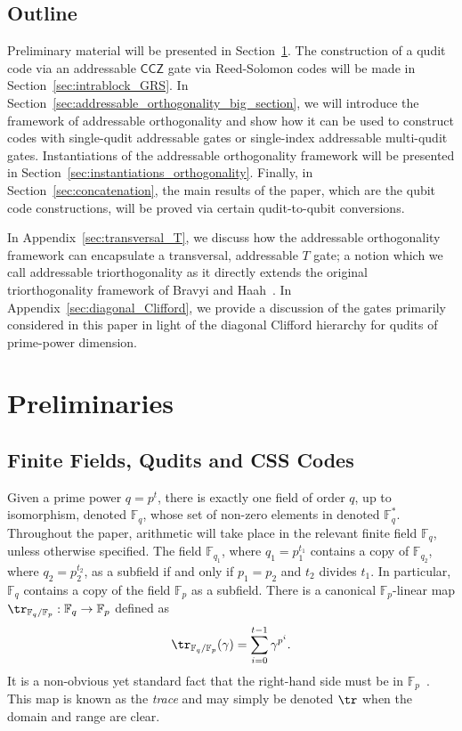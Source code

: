 \documentclass[11pt]{article}
\theoremstyle{definition}
\newcommand{\CCZ}{\mathsf{CCZ}}
\begin{document}
    \subsection{Outline}
    
    Preliminary material will be presented in Section~\ref{sec:prelim}. The construction of a qudit code via an addressable $\CCZ$ gate via Reed-Solomon codes will be made in Section~\ref{sec:intrablock_GRS}. In Section~\ref{sec:addressable_orthogonality_big_section}, we will introduce the framework of addressable orthogonality and show how it can be used to construct codes with single-qudit addressable gates or single-index addressable multi-qudit gates. Instantiations of the addressable orthogonality framework will be presented in Section~\ref{sec:instantiations_orthogonality}. Finally, in Section~\ref{sec:concatenation}, the main results of the paper, which are the qubit code constructions, will be proved via certain qudit-to-qubit conversions.
    
    In Appendix~\ref{sec:transversal_T}, we discuss how the addressable orthogonality framework can encapsulate a transversal, addressable $T$ gate; a notion which we call addressable triorthogonality as it directly extends the original triorthogonality framework of Bravyi and Haah~\cite{bravyi2012magic}. In Appendix~\ref{sec:diagonal_Clifford}, we provide a discussion of the gates primarily considered in this paper in light of the diagonal Clifford hierarchy for qudits of prime-power dimension.
    
    
    
    


\section{Preliminaries}\label{sec:prelim}

\subsection{Finite Fields, Qudits and CSS Codes}\label{sec:prelim_qudit}

Given a prime power $q = p^t$, there is exactly one field of order $q$, up to isomorphism, denoted $\mathbb{F}_q$, whose set of non-zero elements in denoted $\mathbb{F}_q^*$. Throughout the paper, arithmetic will take place in the relevant finite field $\mathbb{F}_q$, unless otherwise specified. The field $\mathbb{F}_{q_1}$, where $q_1 = p_1^{t_1}$ contains a copy of $\mathbb{F}_{q_2}$, where $q_2 = p_2^{t_2}$, as a subfield if and only if $p_1 = p_2$ and $t_2$ divides $t_1$. In particular, $\mathbb{F}_q$ contains a copy of the field $\mathbb{F}_p$ as a subfield. 
There is a canonical $\mathbb{F}_p$-linear map $\tr_{\mathbb{F}_q/\mathbb{F}_p}:\mathbb{F}_q \to \mathbb{F}_p$ defined as
\begin{equation}
    \tr_{\mathbb{F}_q/\mathbb{F}_p}(\gamma) = \sum_{i=0}^{t-1}\gamma^{p^i}.
\end{equation}
It is a non-obvious yet standard fact that the right-hand side must be in $\mathbb{F}_p$~\cite{Lidl_Niederreiter_1996}.
This map is known as the \textit{trace} and may simply be denoted $\tr$ when the domain and range are clear.
\end{document}
